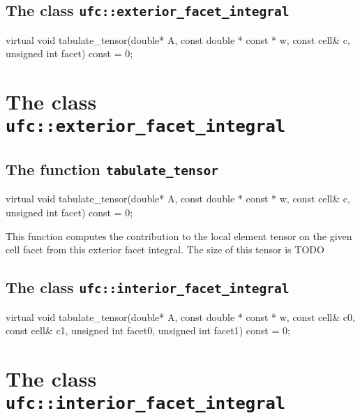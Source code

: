 \subsection{The class \texttt{ufc::exterior\_facet\_integral}}

\begin{code}
virtual void tabulate_tensor(double* A,
                             const double * const * w,
                             const cell& c,
                             unsigned int facet) const = 0;
\end{code}

\section{The class \texttt{ufc::exterior\_facet\_integral}}

\subsection{The function \texttt{tabulate\_tensor}}

\begin{code}
virtual void tabulate_tensor(double* A,
                             const double * const * w,
                             const cell& c,
                             unsigned int facet) const = 0;
\end{code}

This function computes the contribution to the local element tensor
on the given cell facet from this exterior facet integral.
The size of this tensor is TODO

\subsection{The class \texttt{ufc::interior\_facet\_integral}}

\begin{code}
virtual void tabulate_tensor(double* A,
                             const double * const * w,
                             const cell& c0,
                             const cell& c1,
                             unsigned int facet0,
                             unsigned int facet1) const = 0;
\end{code}

\section{The class \texttt{ufc::interior\_facet\_integral}}

